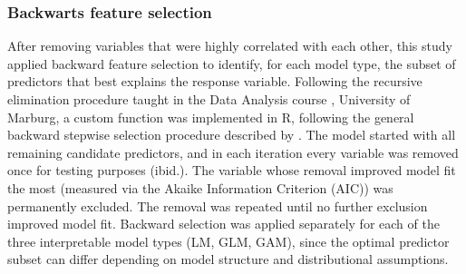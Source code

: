 \documentclass[hidelinks, 11pt]{article}
\begin{document}
\subsubsection{Backwarts feature selection}
After removing variables that were highly correlated with each other, this study applied backward feature selection to identify, for each model type, the subset of predictors that best explains the response variable. Following the recursive elimination procedure taught in the Data Analysis course \citep{zeuss2026feature}, University of Marburg, a custom function was implemented in R, following the general backward stepwise selection procedure described by \citet{james2013islr}. The model started with all remaining candidate predictors, and in each iteration every variable was removed once for testing purposes (ibid.). The variable whose removal improved model fit the most (measured via the Akaike Information Criterion (AIC)) was permanently excluded. The removal was repeated until no further exclusion improved model fit. Backward selection was applied separately for each of the three interpretable model types (LM, GLM, GAM), since the optimal
predictor subset can differ depending on model structure and distributional assumptions.
\end{document}
